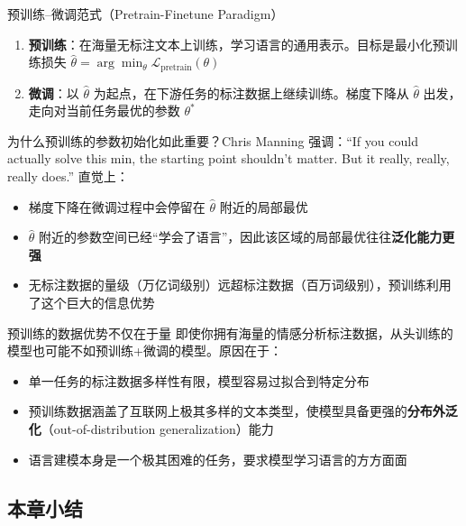 \documentclass[a4paper]{article}
\begin{document}



\begin{importantbox}{预训练--微调范式（Pretrain-Finetune Paradigm）}
\begin{enumerate}
    \item \textbf{预训练}：在海量无标注文本上训练，学习语言的通用表示。目标是最小化预训练损失 $\hat{\theta} = \arg\min_\theta \mathcal{L}_{\text{pretrain}}(\theta)$
    \item \textbf{微调}：以 $\hat{\theta}$ 为起点，在下游任务的标注数据上继续训练。梯度下降从 $\hat{\theta}$ 出发，走向对当前任务最优的参数 $\theta^*$
\end{enumerate}
\end{importantbox}

为什么预训练的参数初始化如此重要？Chris Manning 强调：``If you could actually solve this min, the starting point shouldn't matter. But it really, really, really does.'' 直觉上：

\begin{itemize}
    \item 梯度下降在微调过程中会停留在 $\hat{\theta}$ 附近的局部最优
    \item $\hat{\theta}$ 附近的参数空间已经``学会了语言''，因此该区域的局部最优往往\textbf{泛化能力更强}
    \item 无标注数据的量级（万亿词级别）远超标注数据（百万词级别），预训练利用了这个巨大的信息优势
\end{itemize}

\begin{warningbox}{预训练的数据优势不仅在于量}
即使你拥有海量的情感分析标注数据，从头训练的模型也可能不如预训练+微调的模型。原因在于：
\begin{itemize}
    \item 单一任务的标注数据多样性有限，模型容易过拟合到特定分布
    \item 预训练数据涵盖了互联网上极其多样的文本类型，使模型具备更强的\textbf{分布外泛化}（out-of-distribution generalization）能力
    \item 语言建模本身是一个极其困难的任务，要求模型学习语言的方方面面
\end{itemize}
\end{warningbox}

\subsection{本章小结}
\end{document}
